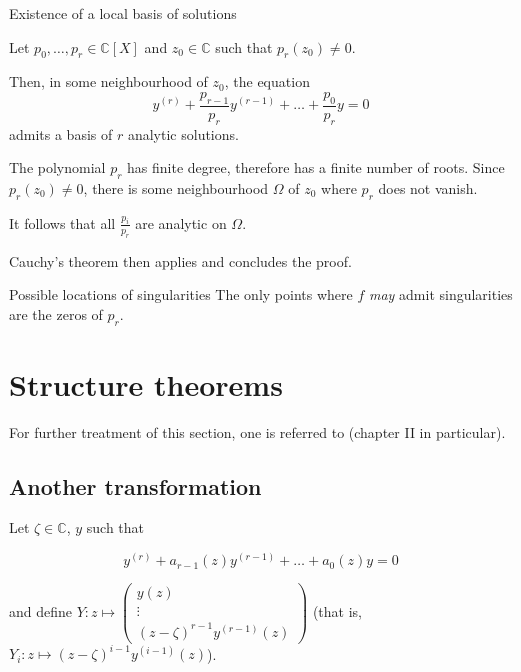 \documentclass[../main.tex]{subfiles}
\begin{document}
\begin{thm}{Existence of a local basis of solutions}
	
	Let $p_0, \dots, p_r \in \mathbb{C}[X]$ and $z_0 \in \mathbb{C}$ such that $p_r (z_0) \neq 0$.
	
	Then, in some neighbourhood of $z_0$, the equation
	\begin{equation}
	y^{(r)} + \frac{p_{r-1}}{p_r} y^{(r - 1)} + \dots + \frac{p_0}{p_r} y = 0
	\end{equation}
	admits a basis of $r$ analytic solutions.
	
	\tcblower
	
	The polynomial $p_r$ has finite degree, therefore has a finite number of roots. Since $p_r(z_0) \neq 0$, there is some neighbourhood $\Omega$ of $z_0$ where $p_r$ does not vanish.
	
	It follows that all $\frac{p_i}{p_r}$ are analytic on $\Omega$.
	
	Cauchy's theorem then applies and concludes the proof.
\end{thm}

\begin{cor}{Possible locations of singularities}\label{cor_sing_location}
	The only points where $f$ \emph{may} admit singularities are the zeros of $p_r$.
\end{cor}


\section{Structure theorems}

For further treatment of this section, one is referred to \cite{Wasow1965} (chapter II in particular).

\subsection*{Another transformation}

Let $\zeta \in \mathbb{C}$, $y$ such that

\begin{equation*}
	y^{(r)} + a_{r - 1}(z) y^{(r - 1)} + \dots + a_0(z) y = 0
\end{equation*}

and define $Y : z \mapsto \begin{pmatrix}
y(z)\\
\vdots \\
{(z - \zeta)}^{r - 1} y^{(r - 1)}(z)
\end{pmatrix}$ (that is, $Y_i : z \mapsto {(z - \zeta)}^{i - 1} y^{(i - 1)}(z)$).
\end{document}
